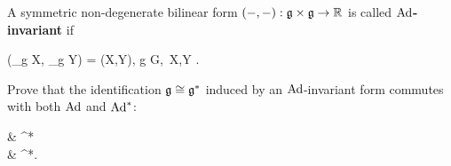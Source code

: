 \documentclass[main.tex]{subfiles}
\begin{document}
\begin{definition}
	A symmetric non-degenerate bilinear form $(-,-) : \mathfrak g \times \mathfrak g \to \mathbb{R}$ is called \textbf{$\operatorname{Ad}$-invariant} if
	\begin{eqalign}
		(\Ad_g X, \Ad_g Y) = (X,Y), \quad \forall g \in G,\, \forall X,Y \in \lalg.
	\end{eqalign}
\end{definition}

\begin{exercise}
	Prove that the identification $\mathfrak g \overset{}{\cong} \mathfrak g^*$ induced by an $\operatorname{Ad}$-invariant form commutes with both $\operatorname{Ad}$ and $\operatorname{Ad}^*$:
	\begin{diagram}
		\lalg {}  \& \lalg^* \\
		\lalg {} \& \lalg^*.
	\end{diagram}
\end{exercise}
\end{document}
